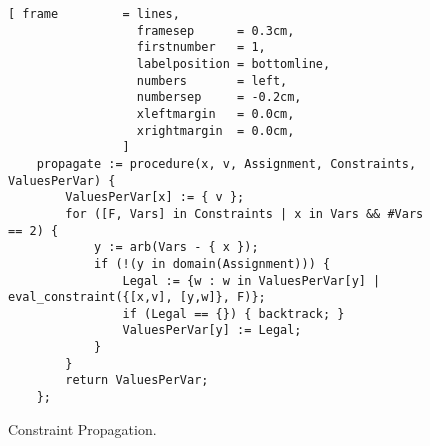 \begin{figure}[!ht]
\centering
\begin{Verbatim}[ frame         = lines, 
                  framesep      = 0.3cm, 
                  firstnumber   = 1,
                  labelposition = bottomline,
                  numbers       = left,
                  numbersep     = -0.2cm,
                  xleftmargin   = 0.0cm,
                  xrightmargin  = 0.0cm,
                ]
    propagate := procedure(x, v, Assignment, Constraints, ValuesPerVar) {
        ValuesPerVar[x] := { v };
        for ([F, Vars] in Constraints | x in Vars && #Vars == 2) {
            y := arb(Vars - { x });
            if (!(y in domain(Assignment))) {
                Legal := {w : w in ValuesPerVar[y] | eval_constraint({[x,v], [y,w]}, F)};
                if (Legal == {}) { backtrack; }
                ValuesPerVar[y] := Legal;
            }
        }
        return ValuesPerVar;
    };
\end{Verbatim}
\vspace*{-0.3cm}
\caption{Constraint Propagation.}
\label{fig:csp-constraint-propagation.stlx-3}
\end{figure}


